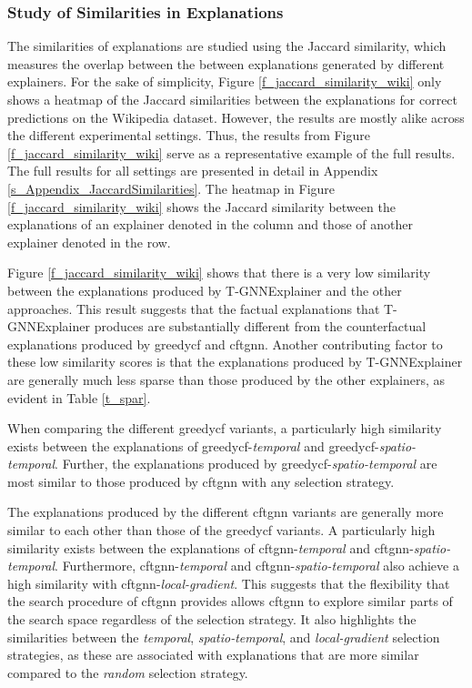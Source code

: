 \FloatBarrier
\subsubsection{Study of Similarities in Explanations}
\label{s_Evaluation_Results_Similarities}

The similarities of explanations are studied using the Jaccard similarity, which measures the overlap between the between explanations generated by different explainers. For the sake of simplicity, Figure \ref{f_jaccard_similarity_wiki} only shows a heatmap of the Jaccard similarities between the explanations for correct predictions on the Wikipedia dataset. However, the results are mostly alike across the different experimental settings. Thus, the results from Figure \ref{f_jaccard_similarity_wiki} serve as a representative example of the full results. The full results for all settings are presented in detail in Appendix \ref{s_Appendix_JaccardSimilarities}. The heatmap in Figure \ref{f_jaccard_similarity_wiki} shows the Jaccard similarity between the explanations of an explainer denoted in the column and those of another explainer denoted in the row.

Figure \ref{f_jaccard_similarity_wiki} shows that there is a very low similarity between the explanations produced by T-GNNExplainer and the other approaches. This result suggests that the factual explanations that T-GNNExplainer produces are substantially different from the counterfactual explanations produced by \gls{greedycf} and \gls{cftgnn}. Another contributing factor to these low similarity scores is that the explanations produced by T-GNNExplainer are generally much less sparse than those produced by the other explainers, as evident in Table \ref{t_spar}.

When comparing the different \gls{greedycf} variants, a particularly high similarity exists between the explanations of \gls{greedycf}-\textit{temporal} and \gls{greedycf}-\textit{spatio-temporal}. Further, the explanations produced by \gls{greedycf}-\textit{spatio-temporal} are most similar to those produced by \gls{cftgnn} with any selection strategy.

The explanations produced by the different \gls{cftgnn} variants are generally more similar to each other than those of the \gls{greedycf} variants. A particularly high similarity exists between the explanations of \gls{cftgnn}-\textit{temporal} and \gls{cftgnn}-\textit{spatio-temporal}. Furthermore, \gls{cftgnn}-\textit{temporal} and \gls{cftgnn}-\textit{spatio-temporal} also achieve a high similarity with \gls{cftgnn}-\textit{local-gradient}. This suggests that the flexibility that the search procedure of \gls{cftgnn} provides allows \gls{cftgnn} to explore similar parts of the search space regardless of the selection strategy. It also highlights the similarities between the \textit{temporal}, \textit{spatio-temporal}, and \textit{local-gradient} selection strategies, as these are associated with explanations that are more similar compared to the \textit{random} selection strategy.



